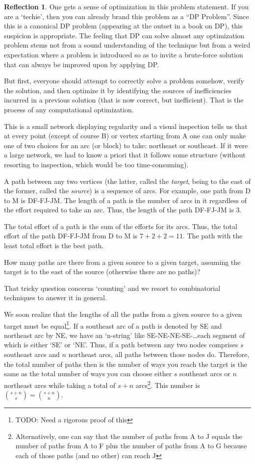 \documentclass[english,notitlepage,smartquotes]{hgbreport}
\theoremstyle{definition}
\theoremstyle{definition}
\theoremstyle{remark}
\theoremstyle{definition}
\theoremstyle{plain}
\theoremstyle{definition}
\newtheorem{reflection}{Reflection}
\begin{document}
\begin{reflection}
One gets a sense of optimization in this problem statement. If you are a `techie', then you can already brand this problem as a ``DP Problem''. Since this is a canonical DP problem (appearing at the outset in a book on DP), this suspicion is appropriate. The feeling that DP can solve almost any optimization problem stems not from a sound understanding of the technique but from a weird expectation where a problem is introduced so as to invite a brute-force solution that can always be improved upon by applying DP.

But first, everyone should attempt to correctly solve a problem somehow, verify the solution, and then optimize it by identifying the sources of inefficiencies incurred in a previous solution (that is now correct, but inefficient). That is the process of any computational optimization.
\end{reflection}


This is a small network displaying regularity and a visual inspection tells us that at every point (except of course B) or vertex starting from A one can only make one of two choices for an arc (or block) to take: northeast or southeast. If it were a large network, we had to know a priori that it follows some structure (without resorting to inspection, which would be too time-consuming). 

A path between any two vertices (the latter, called the \emph{target}, being to the east of the former, called the \emph{source}) is a sequence of arcs. For example, one path from D to M is DF-FJ-JM. The length of a path is the number of arcs in it regardless of the effort required to take an arc. Thus, the length of the path DF-FJ-JM is 3.

The total effort of a path is the sum of the efforts for its arcs. Thus, the total effort of the path DF-FJ-JM from D to M is $7+2+2=11$. The path with the least total effort is the best path. 

How many paths are there from a given source to a given target, assuming the target is to the east of the source (otherwise there are no paths)?   

That tricky question concerns `counting' and we resort to combinatorial techniques to answer it in general. 

We soon realize that the lengths of all the paths from a given source to a given target must be equal\footnote{TODO: Need a rigorous proof of this}. If a southeast arc of a path is denoted by SE and northeast arc by NE, we have an `n-string' like SE-NE-NE-SE-\dots each segment of which is either `SE' or `NE'. Thus, if a path between any two nodes comprises $s$ southeast arcs and $n$ northeast arcs, all paths between those nodes do. Therefore, the total number of paths then is the number of ways you reach the target is the same as the total number of ways you can choose either $s$ southeast arcs or $n$ northeast arcs while taking a total of $s+n$ arcs\footnote{Alternatively, one can say that the number of paths from A to J equals the number of paths from A to F plus the number of paths from A to G because each of those paths (and no other) can reach J}. This number is ${s+n\choose s}={s+n\choose n}$.
\end{document}
